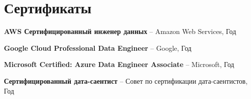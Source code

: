 \section{Сертификаты}

\begin{cvitems}
  \item {\textbf{AWS Сертифицированный инженер данных} -- Amazon Web Services, Год}
  \item {\textbf{Google Cloud Professional Data Engineer} -- Google, Год}
  \item {\textbf{Microsoft Certified: Azure Data Engineer Associate} -- Microsoft, Год}
  \item {\textbf{Сертифицированный дата-саентист} -- Совет по сертификации дата-саентистов, Год}
\end{cvitems}
